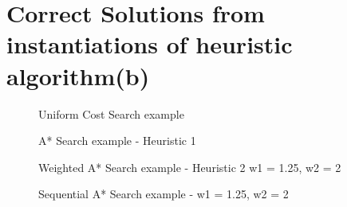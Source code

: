 \section{Correct Solutions from instantiations of heuristic algorithm(b)}

\begin{figure}[H]
	\centering
	\caption{Uniform Cost Search example}
	\label{fig: Uniform Cost Search Path Trace}
\end{figure}

\begin{figure}[H]
	\centering
	\caption{A* Search example - Heuristic 1}
	\label{fig: A* Search Path Trace H2}
\end{figure}

\begin{figure}[H]
	\centering
	\caption{Weighted A* Search example - Heuristic 2 w1 = 1.25, w2 = 2}
	\label{fig: Weighted A* Search Path Trace }
\end{figure}

\begin{figure}[H]
	\centering
	\caption{Sequential A* Search example - w1 = 1.25, w2 = 2}
	\label{fig: Sequential A* Search Path Trace }
\end{figure}
